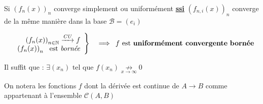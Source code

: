 \documentclass[11pt,a4paper,fleqn,pdftex]{report}
\begin{document}
%
\needspace{3cm}
\begin{theorem}
Si $\left(f_n(x)\right)_n$ converge simplement ou uniformément \uline{\textbf{ssi}} $\left(f_{n,i}(x)\right)_n$ converge de la même manière dans la base $\mathcal{B}=(e_i)$
\end{theorem}
\begin{theorem}
\[
\begin{array}{r c}

\left.
\begin{array}{r}
\left(f_n(x)\right)_{n\in\mathbb{N}}\xrightarrow{\emph{CU}}f\\
\left(f_n(x)\right)_n\ \text{ est \emph{bornée}}\\
\end{array}\right\rbrace & \implies
\end{array}
f \text{ est \textbf{uniformément convergente} \textbf{bornée}}
\]
\end{theorem}
\begin{theorem}
Il suffit que : 
$\exists (x_n)\text{ tel que }f(x_n)\underset{x\to{}\infty}{\nrightarrow}0$
\end{theorem}
On notera les fonctions $f$ dont la dérivée est continue de $A\to B$ comme appartenant à l'ensemble $\mathcal{C}(A,B)$
\end{document}
